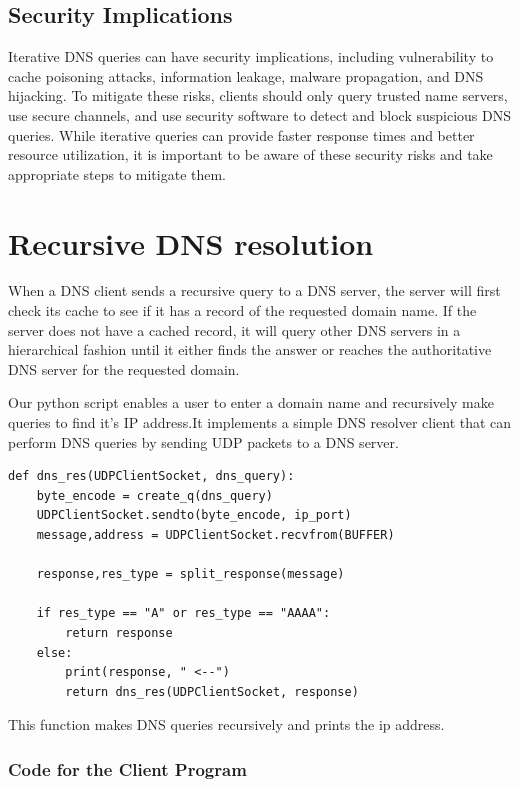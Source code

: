 \documentclass[11pt]{article}
\begin{document}
\subsection{Security Implications}
Iterative DNS queries can have security implications, including vulnerability to cache poisoning attacks, information leakage, malware propagation, and DNS hijacking. To mitigate these risks, clients should only query trusted name servers, use secure channels, and use security software to detect and block suspicious DNS queries. While iterative queries can provide faster response times and better resource utilization, it is important to be aware of these security risks and take appropriate steps to mitigate them.


\section{Recursive DNS resolution}
When a DNS client sends a recursive query to a DNS server, the server will first check its cache to see if it has a record of the requested domain name. If the server does not have a cached record, it will query other DNS servers in a hierarchical fashion until it either finds the answer or reaches the authoritative DNS server for the requested domain.

Our python script enables a user to enter a domain name and recursively make queries to find it’s IP address.It implements a simple DNS resolver client that can perform DNS queries by sending UDP packets to a DNS server.


\begin{verbatim}
def dns_res(UDPClientSocket, dns_query):
    byte_encode = create_q(dns_query)
    UDPClientSocket.sendto(byte_encode, ip_port)
    message,address = UDPClientSocket.recvfrom(BUFFER)

    response,res_type = split_response(message)

    if res_type == "A" or res_type == "AAAA":
        return response
    else:
        print(response, " <--")
        return dns_res(UDPClientSocket, response)
\end{verbatim}

This function makes DNS queries recursively and prints the ip address.


\subsubsection{Code for the Client Program}
\end{document}
